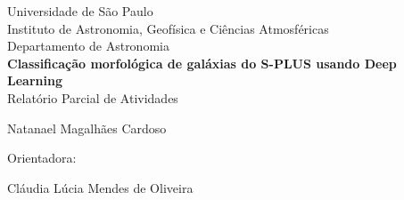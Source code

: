 \begin{titlepage}
  \begin{center}
    Universidade de São Paulo\\
    Instituto de Astronomia, Geofísica e Ciências Atmosféricas\\
    Departamento de Astronomia\\
    
    \vfill
    \large
    \textbf{Classificação morfológica de galáxias do S-PLUS usando Deep Learning}\\
    \vspace{.6cm}
    Relatório Parcial de Atividades
    
    \vfill
    Natanael Magalhães Cardoso\\
    \begin{large} 
        Orientadora:
    \end{large}Cláudia Lúcia Mendes de Oliveira
    \vspace{2cm}
  \end{center}
\end{titlepage}